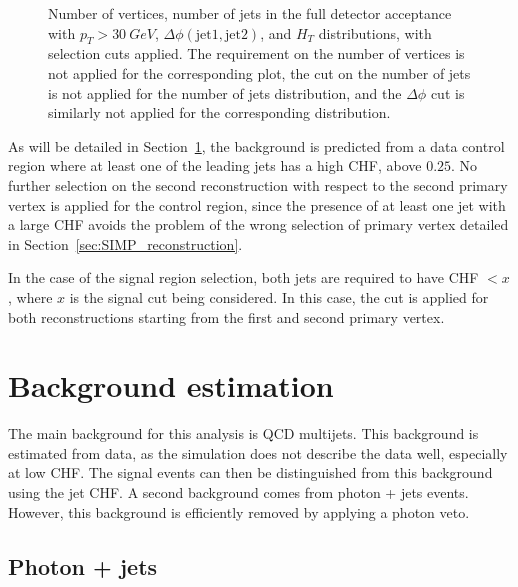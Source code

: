 \begin{figure}[ht]
  \caption{Number of vertices, number of jets in the full detector acceptance with $p_T > \SI{30}{GeV}$, $\Delta\phi (\mathrm{jet}1, \mathrm{jet}2)$, and $H_{T}$ distributions, with selection cuts applied. The requirement on the number of vertices is not applied for the corresponding plot, the cut on the number of jets is not applied for the number of jets distribution, and the $\Delta\phi$ cut is similarly not applied for the corresponding distribution.}
  \label{fig:event_selection_2}
\end{figure}

As will be detailed in Section~\ref{sec:SIMP_backgrounds}, the background is predicted from a data control region where at least one of the leading jets has a high CHF, above $0.25$. No further selection on the second reconstruction with respect to the second primary vertex is applied for the control region, since the presence of at least one jet with a large CHF avoids the problem of the wrong selection of primary vertex detailed in Section~\ref{sec:SIMP_reconstruction}.

In the case of the signal region selection, both jets are required to have CHF $< x$, where $x$ is the signal cut being considered. In this case, the cut is applied for both reconstructions starting from the first and second primary vertex.

\section{Background estimation}
\label{sec:SIMP_backgrounds}

The main background for this analysis is \ac{QCD} multijets. This background is estimated from data, as the simulation does not describe the data well, especially at low CHF. The signal events can then be distinguished from this background using the jet CHF. A second background comes from photon + jets events. However, this background is efficiently removed by applying a photon veto.

\subsection{Photon + jets}

